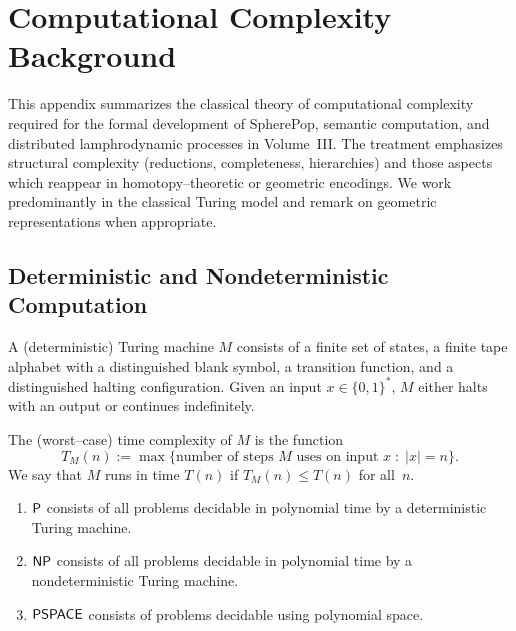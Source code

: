 
\chapter{Computational Complexity Background}
\label{app:complexity}

This appendix summarizes the classical theory of computational complexity
required for the formal development of SpherePop, semantic computation, and
distributed lamphrodynamic processes in Volume~III.  The treatment emphasizes
structural complexity (reductions, completeness, hierarchies) and those aspects
which reappear in homotopy--theoretic or geometric encodings.  We work
predominantly in the classical Turing model and remark on geometric
representations when appropriate.

\section{Deterministic and Nondeterministic Computation}

\begin{definition}
A (deterministic) Turing machine $M$ consists of a finite set of states,
a finite tape alphabet with a distinguished blank symbol,
a transition function, and a distinguished halting configuration.
Given an input $x \in \{0,1\}^\ast$, $M$ either halts with an output or
continues indefinitely.
\end{definition}

\begin{definition}
The (worst--case) time complexity of $M$ is the function
\[
T_M(n) := \max \{ \text{number of steps $M$ uses on input $x$} \;:\; |x|=n \}.
\]
We say that $M$ runs in time $T(n)$ if $T_M(n)\le T(n)$ for all~$n$.
\end{definition}

\begin{definition}
\begin{enumerate}
  \item ${\sf P}$ consists of all problems decidable in polynomial time
        by a deterministic Turing machine.
  \item ${\sf NP}$ consists of all problems decidable in polynomial time
        by a nondeterministic Turing machine.
  \item ${\sf PSPACE}$ consists of problems decidable using polynomial space.
\end{enumerate}
\end{definition}

